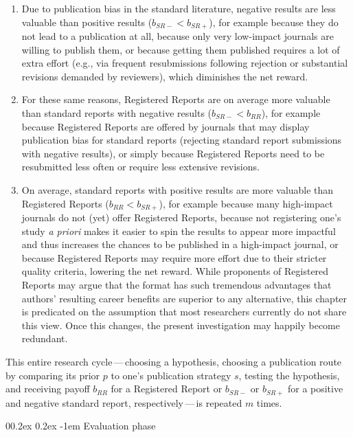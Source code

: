 \documentclass[
  ,man,mask,floatsintext]{apa6}
\makeatletter
\providecommand{\tightlist}{%
  \setlength{\itemsep}{0pt}\setlength{\parskip}{0pt}}
\let\oldparagraph\paragraph
\renewcommand{\paragraph}[1]{\oldparagraph{#1}\mbox{}}
\renewcommand{\paragraph}{\@startsection{paragraph}{4}{\parindent}%
  {0\baselineskip \@plus 0.2ex \@minus 0.2ex}%
  {-1em}%
  {\normalfont\normalsize\bfseries\itshape\typesectitle}}
\makeatother
\begin{document}
\begin{enumerate}
\def\labelenumi{\arabic{enumi}.}
\tightlist
\item
  Due to publication bias in the standard literature, negative results are less valuable than positive results (\(b_{SR-} < b_{SR+}\)), for example because they do not lead to a publication at all, because only very low-impact journals are willing to publish them, or because getting them published requires a lot of extra effort (e.g., via frequent resubmissions following rejection or substantial revisions demanded by reviewers), which diminishes the net reward.
\item
  For these same reasons, Registered Reports are on average more valuable than standard reports with negative results (\(b_{SR-} < b_{RR}\)), for example because Registered Reports are offered by journals that may display publication bias for standard reports (rejecting standard report submissions with negative results), or simply because Registered Reports need to be resubmitted less often or require less extensive revisions.
\item
  On average, standard reports with positive results are more valuable than Registered Reports (\(b_{RR} < b_{SR+}\)), for example because many high-impact journals do not (yet) offer Registered Reports, because not registering one's study \emph{a priori} makes it easier to spin the results to appear more impactful and thus increases the chances to be published in a high-impact journal, or because Registered Reports may require more effort due to their stricter quality criteria, lowering the net reward.
  While proponents of Registered Reports may argue that the format has such tremendous advantages that authors' resulting career benefits are superior to any alternative, this chapter is predicated on the assumption that most researchers currently do not share this view.
  Once this changes, the present investigation may happily become redundant.
\end{enumerate}

This entire research cycle\(\,\)---\(\,\)choosing a hypothesis, choosing a publication route by comparing its prior \(p\) to one's publication strategy \(s\), testing the hypothesis, and receiving payoff \(b_{RR}\) for a Registered Report or \(b_{SR-}\) or \(b_{SR+}\) for a positive and negative standard report, respectively\(\,\)---\(\,\)is repeated \(m\) times.

\hypertarget{evaluation-phase}{%
\paragraph{Evaluation phase}\label{evaluation-phase}}
\end{document}
